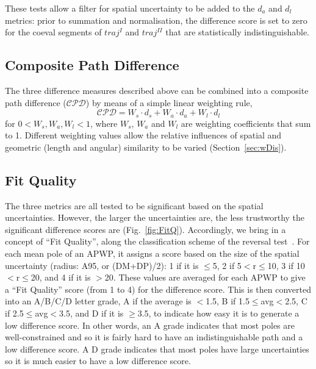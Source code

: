 These tests allow a filter for spatial uncertainty to be added to the $d_a$ and
$d_l$ metrics: prior to summation and normalisation, the difference score is set
to zero for the coeval segments of $traj^I$ and $traj^{II}$ that are
statistically indistinguishable.

\subsection{Composite Path Difference}

The three difference measures described above can be combined into a composite
path difference ($\mathcal{CPD}$) by means of a simple linear weighting rule,
%
\begin{equation*}
\mathcal{CPD} = W_s \cdot d_s + W_a \cdot d_a + W_l \cdot d_l
\label{eq:cpd}
\end{equation*}
%
for $0 < W_s,W_a,W_l < 1$, where $W_s$, $W_a$ and $W_l$ are weighting
coefficients that sum to 1. Different weighting values allow the relative
influences of spatial and geometric (length and angular) similarity to be
varied (Section~\ref{sec:wDis}).

\subsection{Fit Quality}

The three metrics are all tested to be significant based on the spatial
uncertainties. However, the larger the uncertainties are, the less trustworthy
the significant difference scores are (Fig.~\ref{fig:FitQ}). Accordingly, we
bring in a concept of ``Fit Quality'', along the classification scheme of the
reversal test~\cite{M90}. For each mean pole of an APWP, it assigns a score
based on the size of the spatial uncertainty (radius: A95, or (DM+DP)/2): 1 if
it is $\leq$5\degree, 2 if 5\degree$<$r$\leq$10\degree, 3 if
10\degree$<$r$\leq$20\degree, and 4 if it is $>$20\degree. These values are
averaged for each APWP to give a ``Fit Quality'' score (from 1 to 4) for the
difference score. This is then converted into an A/B/C/D letter grade, A if the
average is $<$1.5, B if 1.5$\leq$avg$<$2.5, C if 2.5$\leq$avg$<$3.5, and D if it
is $\geq$3.5, to indicate how easy it is to generate a low difference score. In
other words, an A grade indicates that most poles are well-constrained and so it
is fairly hard to have an indistinguishable path and a low difference score. A D
grade indicates that most poles have large uncertainties so it is much easier to
have a low difference score.
